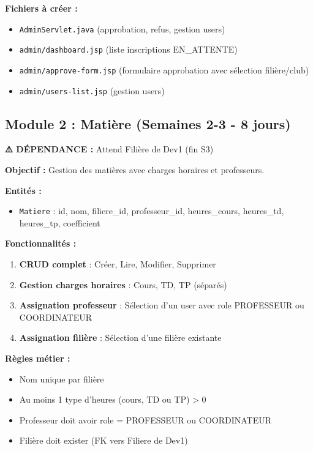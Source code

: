 \documentclass[11pt,a4paper]{article}
\begin{document}
\textbf{Fichiers à créer :}
\begin{itemize}
    \item \texttt{AdminServlet.java} (approbation, refus, gestion users)
    \item \texttt{admin/dashboard.jsp} (liste inscriptions EN\_ATTENTE)
    \item \texttt{admin/approve-form.jsp} (formulaire approbation avec sélection filière/club)
    \item \texttt{admin/users-list.jsp} (gestion users)
\end{itemize}

\subsection{Module 2 : Matière (Semaines 2-3 - 8 jours)}

\textbf{⚠️ DÉPENDANCE :} Attend Filière de Dev1 (fin S3)

\textbf{Objectif :} Gestion des matières avec charges horaires et professeurs.

\textbf{Entités :}
\begin{itemize}
    \item \texttt{Matiere} : id, nom, filiere\_id, professeur\_id, heures\_cours, heures\_td, heures\_tp, coefficient
\end{itemize}

\textbf{Fonctionnalités :}
\begin{enumerate}
    \item \textbf{CRUD complet} : Créer, Lire, Modifier, Supprimer
    \item \textbf{Gestion charges horaires} : Cours, TD, TP (séparés)
    \item \textbf{Assignation professeur} : Sélection d'un user avec role PROFESSEUR ou COORDINATEUR
    \item \textbf{Assignation filière} : Sélection d'une filière existante
\end{enumerate}

\textbf{Règles métier :}
\begin{itemize}
    \item Nom unique par filière
    \item Au moins 1 type d'heures (cours, TD ou TP) > 0
    \item Professeur doit avoir role = PROFESSEUR ou COORDINATEUR
    \item Filière doit exister (FK vers Filiere de Dev1)
\end{itemize}
\end{document}
